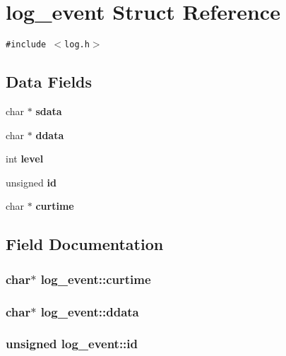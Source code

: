 \section{log\_\-event Struct Reference}
\label{structlog__event}
{\tt \#include $<$log.h$>$}

\subsection*{Data Fields}
\begin{CompactItemize}
\item 
char $\ast$ {\bf sdata}
\item 
char $\ast$ {\bf ddata}
\item 
int {\bf level}
\item 
unsigned {\bf id}
\item 
char $\ast$ {\bf curtime}
\end{CompactItemize}


\subsection{Field Documentation}
\subsubsection[{curtime}]{\setlength{\rightskip}{0pt plus 5cm}char$\ast$ {\bf log\_\-event::curtime}}\label{structlog__event_a0888bc8900bf3b909c7b02ab72ec4df}


\subsubsection[{ddata}]{\setlength{\rightskip}{0pt plus 5cm}char$\ast$ {\bf log\_\-event::ddata}}\label{structlog__event_e4841d507de979b6edab9de953e2f6d9}


\subsubsection[{id}]{\setlength{\rightskip}{0pt plus 5cm}unsigned {\bf log\_\-event::id}}\label{structlog__event_6c8e80075bcf361fe1dbbf625ff6b5b8}


